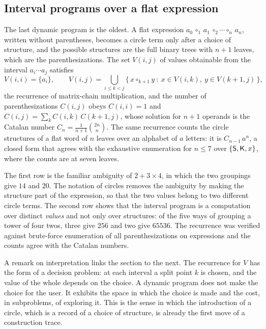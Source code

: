 \subsection{Interval programs over a flat expression}

The last dynamic program is the oldest. A flat expression $a_0\,\circ_1\,a_1\,\circ_2\cdots\circ_n\,a_n$, written without parentheses, becomes a circle term only after a choice of structure, and the possible structures are the full binary trees with $n+1$ leaves, which are the parenthesizations. The set $V(i,j)$ of values obtainable from the interval $a_i\cdots a_j$ satisfies
\[
V(i,i)=\{a_i\},
\qquad
V(i,j)=\bigcup_{i\le k<j}\{\,x\circ_{k+1}y\ :\ x\in V(i,k),\ y\in V(k+1,j)\,\},
\]
the recurrence of matrix-chain multiplication, and the number of parenthesizations $C(i,j)$ obeys $C(i,i)=1$ and $C(i,j)=\sum_{k}C(i,k)\,C(k+1,j)$, whose solution for $n+1$ operands is the Catalan number $C_n=\frac1{n+1}\binom{2n}{n}$. The same recurrence counts the circle structures of a flat word of $n$ leaves over an alphabet of $a$ letters: it is $C_{n-1}\,a^{n}$, a closed form that agrees with the exhaustive enumeration for $n\le7$ over $\{\mathsf{S},\mathsf{K},x\}$, where the counts are \factEnumSeven{} at seven leaves.

\begin{center}
\tableGrouping
\end{center}

The first row is the familiar ambiguity of $2+3\times4$, in which the two groupings give $14$ and $20$. The notation of circles removes the ambiguity by making the structure part of the expression, so that the two values belong to two different circle terms. The second row shows that the interval program is a computation over distinct \emph{values} and not only over structures: of the five ways of grouping a tower of four twos, three give $256$ and two give $65536$. The recurrence was verified against brute-force enumeration of all parenthesizations on \factGroupingExpressions{} expressions and the counts agree with the Catalan numbers.

A remark on interpretation links the section to the next. The recurrence for $V$ has the form of a decision problem: at each interval a split point $k$ is chosen, and the value of the whole depends on the choice. A dynamic program does not make the choice for the user. It exhibits the space in which the choice is made and the cost, in subproblems, of exploring it. This is the sense in which the introduction of a circle, which is a record of a choice of structure, is already the first move of a construction trace.
